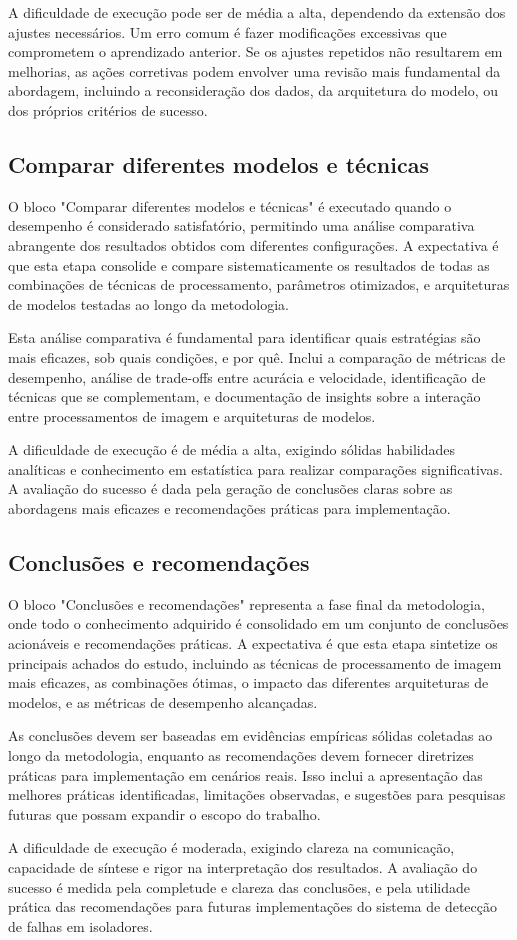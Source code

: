 A dificuldade de execução pode ser de média a alta, dependendo da extensão dos ajustes necessários. Um erro comum é fazer modificações excessivas que comprometem o aprendizado anterior. Se os ajustes repetidos não resultarem em melhorias, as ações corretivas podem envolver uma revisão mais fundamental da abordagem, incluindo a reconsideração dos dados, da arquitetura do modelo, ou dos próprios critérios de sucesso.

\subsection{Comparar diferentes modelos e técnicas}
O bloco "Comparar diferentes modelos e técnicas" é executado quando o desempenho é considerado satisfatório, permitindo uma análise comparativa abrangente dos resultados obtidos com diferentes configurações. A expectativa é que esta etapa consolide e compare sistematicamente os resultados de todas as combinações de técnicas de processamento, parâmetros otimizados, e arquiteturas de modelos testadas ao longo da metodologia.

Esta análise comparativa é fundamental para identificar quais estratégias são mais eficazes, sob quais condições, e por quê. Inclui a comparação de métricas de desempenho, análise de trade-offs entre acurácia e velocidade, identificação de técnicas que se complementam, e documentação de insights sobre a interação entre processamentos de imagem e arquiteturas de modelos.

A dificuldade de execução é de média a alta, exigindo sólidas habilidades analíticas e conhecimento em estatística para realizar comparações significativas. A avaliação do sucesso é dada pela geração de conclusões claras sobre as abordagens mais eficazes e recomendações práticas para implementação.

\subsection{Conclusões e recomendações}
O bloco "Conclusões e recomendações" representa a fase final da metodologia, onde todo o conhecimento adquirido é consolidado em um conjunto de conclusões acionáveis e recomendações práticas. A expectativa é que esta etapa sintetize os principais achados do estudo, incluindo as técnicas de processamento de imagem mais eficazes, as combinações ótimas, o impacto das diferentes arquiteturas de modelos, e as métricas de desempenho alcançadas.

As conclusões devem ser baseadas em evidências empíricas sólidas coletadas ao longo da metodologia, enquanto as recomendações devem fornecer diretrizes práticas para implementação em cenários reais. Isso inclui a apresentação das melhores práticas identificadas, limitações observadas, e sugestões para pesquisas futuras que possam expandir o escopo do trabalho.

A dificuldade de execução é moderada, exigindo clareza na comunicação, capacidade de síntese e rigor na interpretação dos resultados. A avaliação do sucesso é medida pela completude e clareza das conclusões, e pela utilidade prática das recomendações para futuras implementações do sistema de detecção de falhas em isoladores.